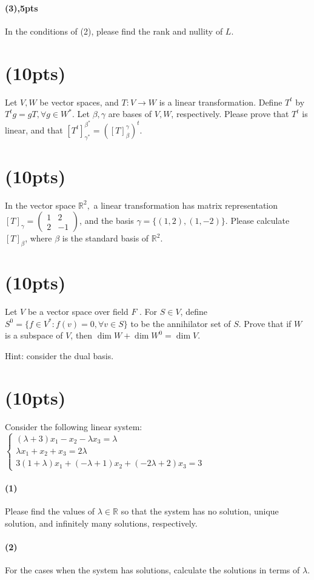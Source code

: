 \documentclass{article}
\begin{document}
\paragraph{(3),5pts}
In the conditions of (2), please find the rank and nullity of $L$.
\section{(10pts)}
Let $V,W$ be vector spaces, and $T:V\rightarrow W$ is a linear transformation. Define $T^t$ by $T^t g=gT,\forall g\in W^*$. Let $\beta,\gamma$ are bases of $V,W$, respectively. Please prove that $T^t$ is linear, and that $[T^t]_{\gamma^*}^{\beta^*}=([T]_{\beta}^{\gamma})^t$. 
\section{(10pts)}
In the vector space $\mathbb{R}^2,$ a linear transformation has matrix representation $[T]_\gamma=\begin{pmatrix}
    1&2\\2&-1
\end{pmatrix}$, and the basis $\gamma=\{(1,2),(1,-2)\}$. Please calculate $[T]_\beta$, where $\beta$ is the standard basis of $\mathbb{R}^2$.
\section{(10pts)}
Let $V$ be a vector space over field $F$ . For $S\in V$, define $S^0=\{f\in V^*: f(v)=0,\forall v\in S\}$ to be the annihilator set of $S$. Prove that if $W$ is a subspace of $V$, then $\dim W+\dim W^0=\dim V$.

Hint: consider the dual basis.
\section{(10pts)}
Consider the following linear system:
$\begin{cases} (\lambda+3)x_1- x_2- \lambda x_3=\lambda \\ \lambda x_1+x_2+x_3=2\lambda\\ 3(1+\lambda) x_1+(-\lambda+1) x_2+(-2\lambda +2)x_3=3\end{cases}$
\paragraph{(1)}Please find the values of $\lambda\in \mathbb{R}$ so that the system has no solution, unique solution, and infinitely many solutions, respectively.
\paragraph{(2)} For the cases when the system has solutions, calculate the solutions in terms of $\lambda$.
\end{document}
